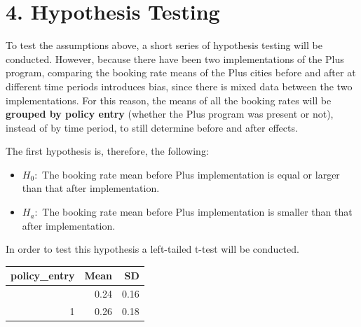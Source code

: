 \documentclass[
  12pt,
]{article}
\begin{document}
\section{4. Hypothesis Testing}\label{hypothesis-testing}

To test the assumptions above, a short series of hypothesis testing will
be conducted. However, because there have been two implementations of
the Plus program, comparing the booking rate means of the Plus cities
before and after at different time periods introduces bias, since there
is mixed data between the two implementations. For this reason, the
means of all the booking rates will be \textbf{grouped by policy entry}
(whether the Plus program was present or not), instead of by time
period, to still determine before and after effects.

The first hypothesis is, therefore, the following:

\begin{itemize}
\item
  \(H_0:\) The booking rate mean before Plus implementation is equal or
  larger than that after implementation.
\item
  \(H_a:\) The booking rate mean before Plus implementation is smaller
  than that after implementation.
\end{itemize}

In order to test this hypothesis a left-tailed t-test will be conducted.

\begin{longtable}[]{@{}rrr@{}}
\toprule\noalign{}
policy\_entry & Mean & SD \\
\midrule\noalign{}
\endhead
\bottomrule\noalign{}
\endlastfoot
0 & 0.24 & 0.16 \\
1 & 0.26 & 0.18 \\
\end{longtable}
\end{document}
